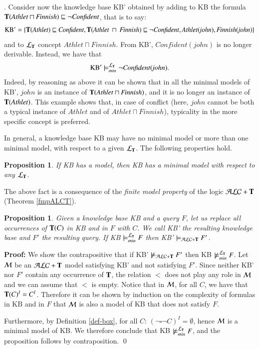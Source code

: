 \documentclass[a4paper, 11pt, oneside]{elsarticle}
\newcommand{\tip}{{\bf T}}
\newcommand{\alct}{\mathcal{ALC}+\tip}
\newcommand {\emme} {\begin{mathcal}M\end{mathcal}}
\newcommand {\bbox}{\square}
\newcommand{\sqset}{\sqsubseteq}
\newcommand{\mint}{\sqcap}
\newcommand {\ellet} {\mathcal{L}_{\bf T}}
\newenvironment{proof}
{\begin{trivlist} \item[] {\bf Proof:}}%
{\qed \end{trivlist}}
\newtheorem{proposition}{Proposition}
\newcounter{posu}
\newtheorem{proposition}[posu]{Proposition}
\newtheorem{proof}[posu]{Proof}
\begin{document}
. Consider now the knowledge base KB' obtained by adding to KB the
formula $\tip(\mathit{Athlet} \mint \mathit{Finnish}) \sqsubseteq \neg \mathit{Confident}$, that is to say:
$$\mbox{KB'}  = \{ \tip(\mathit{Athlet}) \sqset \mathit{Confident}, \tip(\mathit{Athlet} \ \mint \ \mathit{Finnish}) \sqsubseteq \neg \mathit{Confident},
\mathit{Athlet}(\mathit{john}), \mathit{Finnish}(\mathit{john})\}$$
and to ${\ellet}$ concept
$\mathit{Athlet} \mint \mathit{Finnish}$. From KB', $\mathit{Confident}(\mathit{john})$ is no longer derivable.
Instead, we have that $$\mbox{KB}' \models_{min}^{\ellet} \neg \mathit{Confident}(\mathit{john}).$$ Indeed, by reasoning as above it can be shown that in all the minimal models of KB', $\mathit{john}$ is an instance of $\tip(\mathit{Athlet} \mint \mathit{Finnish})$, and it is
no longer an instance of $\tip(\mathit{Athlet})$. This example shows that, in case of
conflict (here, $\mathit{john}$ cannot be both a typical instance of $\mathit{Athlet}$ and of
$\mathit{Athlet} \mint \mathit{Finnish}$), typicality in the more specific concept is
preferred.

\vspace{0.35cm}

\noindent In general, a knowledge base KB may have no minimal model or more
than one minimal model, with respect to a given $\ellet$. The following properties hold.

\begin{proposition}\label{proprModMinimali1}
If \emph{KB} has a model, then \emph{KB} has a minimal model with respect to
any $\ellet$.
\end{proposition}

The above fact  is  a consequence of the \emph{finite model property} of the logic $\alct$ (Theorem \ref{fmpALCT}).


\begin{proposition}\label{proprModMinimali2} Given a knowledge base \emph{KB} and a query $F$, let us replace
all occurrences of  $\tip(C)$ in \emph{KB} and in $F$ with $C$. We
call  \emph{KB'} the resulting knowledge base and $F'$ the
resulting query. If \emph{KB} $\models_{min}^{\ellet} F$ then
\emph{KB'} $\models_{\alct} F'$.
\end{proposition}
\begin{proof} We show the contrapositive that if
KB' $\not\models_{\alct} F'$ then KB
$\not\models_{min}^{\ellet} F$. Let $\emme$ be an $\alct$ model
satisfying KB' and not satisfying $F'$. Since neither
KB' nor $F'$ contain any occurrence of $\tip$, the relation $<$ does not
play any role in $\emme$ and we can assume that  $<$ is empty.
Notice that in $\emme$, for all $C$, we have that $\tip(C)^I = C^I$. Therefore it
can be shown by induction on the complexity of formulas in
KB and in $F$ that $\emme$ is also a model of KB that
does not satisfy $F$.

Furthermore,  by Definition \ref{def-box}, for all $C$: $(\neg
\bbox \neg C)^I = \emptyset$, hence $\emme$ is a minimal model of
KB. We therefore conclude that KB
$\not\models_{min}^{\ellet} F$, and the proposition follows by
contraposition.
\end{proof}
\end{document}
